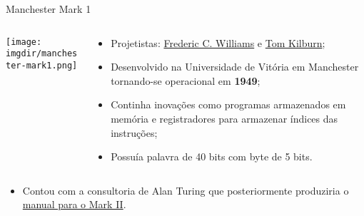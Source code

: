 \begin{frame}{Manchester Mark 1}
  \begin{columns}
    \begin{column}{.45\textwidth}
      \texttt{[image: \\imgdir/manchester-mark1.png]}
    \end{column}

    \begin{column}{.55\textwidth}
      \begin{itemize}
      \item Projetistas:
        \href{http://en.wikipedia.org/wiki/Frederic_Calland_Williams}{Frederic
          C. Williams} e \href{Tom Kilburn}{Tom Kilburn};
      \item Desenvolvido na Universidade de Vitória em Manchester
        tornando-se operacional em {\bf 1949};
      \item Continha inovações como programas armazenados em
        memória e registradores para armazenar índices das instruções;
      \item Possuía palavra de 40 bits com byte de 5 bits.
      \end{itemize}
    \end{column}
  \end{columns}

  \begin{itemize}
  \item Contou com a consultoria de Alan Turing que posteriormente
    produziria o
    \href{http://www.digital60.org/documents/turing.png}{manual para o
      Mark II}.
  \end{itemize}
\end{frame}

